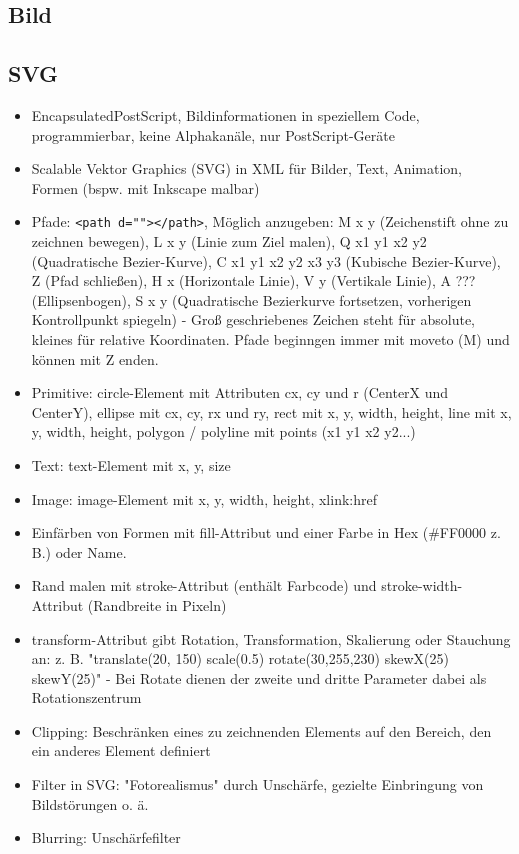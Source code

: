 \documentclass[12pt,landscape]{article}
\begin{document}
\begin{multicols}{3}
\section{Bild}
\subsection{SVG}
\begin{itemize}
\item EncapsulatedPostScript, Bildinformationen in speziellem Code, programmierbar, keine Alphakanäle, nur PostScript-Geräte
\item Scalable Vektor Graphics (SVG) in XML für Bilder, Text, Animation, Formen (bspw. mit Inkscape malbar)
\item Pfade: \lstinline|<path d=""></path>|, Möglich anzugeben: M x y (Zeichenstift ohne zu zeichnen bewegen), L x y (Linie zum Ziel malen), Q x1 y1 x2 y2 (Quadratische Bezier-Kurve), C x1 y1 x2 y2 x3 y3 (Kubische Bezier-Kurve), Z (Pfad schließen), H x (Horizontale Linie), V y (Vertikale Linie), A ??? (Ellipsenbogen), S x y (Quadratische Bezierkurve fortsetzen, vorherigen Kontrollpunkt spiegeln) - Groß geschriebenes Zeichen steht für absolute, kleines für relative Koordinaten. Pfade beginngen immer mit moveto (M) und können mit Z enden.
\item Primitive: circle-Element mit Attributen cx, cy und r (CenterX und CenterY), ellipse mit cx, cy, rx und ry, rect mit x, y, width, height, line mit x, y, width, height, polygon / polyline mit points (x1 y1 x2 y2...)
\item Text: text-Element mit x, y, size
\item Image: image-Element mit x, y, width, height, xlink:href
\item Einfärben von Formen mit fill-Attribut und einer Farbe in Hex (\#FF0000 z. B.) oder Name.
\item Rand malen mit stroke-Attribut (enthält Farbcode) und stroke-width-Attribut (Randbreite in Pixeln)
\item transform-Attribut gibt Rotation, Transformation, Skalierung oder Stauchung an: z. B. "translate(20, 150) scale(0.5) rotate(30,255,230) skewX(25) skewY(25)" - Bei Rotate dienen der zweite und dritte Parameter dabei als Rotationszentrum
\item Clipping: Beschränken eines zu zeichnenden Elements auf den Bereich, den ein anderes Element definiert
\item Filter in SVG: "Fotorealismus" durch Unschärfe, gezielte Einbringung von Bildstörungen o. ä.
\item Blurring: Unschärfefilter

\end{itemize}
\end{multicols}
\end{document}
